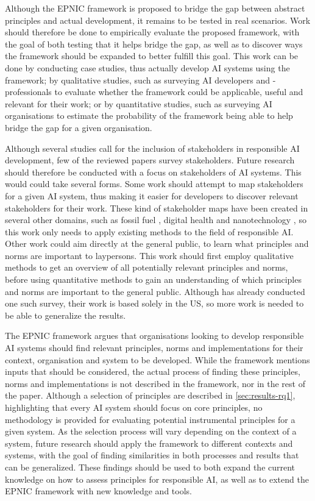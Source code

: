 Although the EPNIC framework is proposed to bridge the gap between abstract principles and actual development, it remains to be tested in real scenarios. Work should therefore be done to empirically evaluate the proposed framework, with the goal of both testing that it helps bridge the gap, as well as to discover ways the framework should be expanded to better fulfill this goal. This work can be done by conducting case studies, thus actually develop AI systems using the framework; by qualitative studies, such as surveying AI developers and -professionals to evaluate whether the framework could be applicable, useful and relevant for their work; or by quantitative studies, such as surveying AI organisations to estimate the probability of the framework being able to help bridge the gap for a given organisation.


Although several studies call for the inclusion of stakeholders in responsible AI development, few of the reviewed papers survey stakeholders. Future research should therefore be conducted with a focus on stakeholders of AI systems. This would could take several forms. Some work should attempt to map stakeholders for a given AI system, thus making it easier for developers to discover relevant stakeholders for their work. These kind of stakeholder maps have been created in several other domains, such as fossil fuel \parencite{Yudha_2018_stakeholdermap}, digital health \parencite{An_2022_stakeholdermap} and nanotechnology \parencite{Hansen_2010_stakeholdermap}, so this work only needs to apply existing methods to the field of responsible AI. Other work could aim directly at the general public, to learn what principles and norms are important to laypersons. This work should first employ qualitative methods to get an overview of all potentially relevant principles and norms, before using quantitative methods to gain an understanding of which principles and norms are important to the general public. Although \textcite{Jakesch_2022} has already conducted one such survey, their work is based solely in the US, so more work is needed to be able to generalize the results.

The EPNIC framework argues that organisations looking to develop responsible AI systems should find relevant principles, norms and implementations for their context, organisation and system to be developed. While the framework mentions inputs that should be considered, the actual process of finding these principles, norms and implementations is not described in the framework, nor in the rest of the paper. Although a selection of principles are described in \autoref{sec:results-rq1}, highlighting that every AI system should focus on core principles, no methodology is provided for evaluating potential instrumental principles for a given system. As the selection process will vary depending on the context of a system, future research should apply the framework to different contexts and systems, with the goal of finding similarities in both processes and results that can be generalized. These findings should be used to both expand the current knowledge on how to assess principles for responsible AI, as well as to extend the EPNIC framework with new knowledge and tools.


